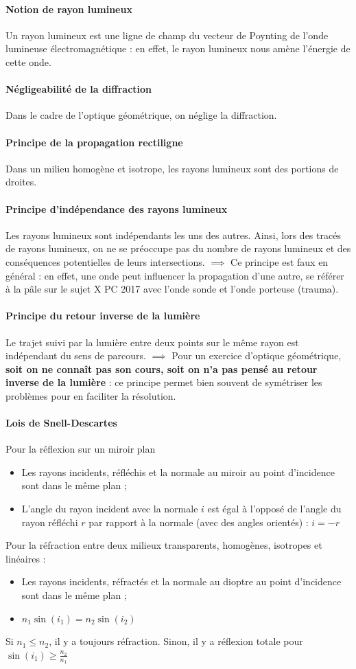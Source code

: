 \documentclass[french]{book}
\theoremstyle{plain}
\theoremstyle{definition}
\theoremstyle{remark}
\begin{document}
\paragraph{Notion de rayon lumineux} Un rayon lumineux est une ligne de champ du vecteur de Poynting de l'onde lumineuse électromagnétique : en effet, le rayon lumineux nous amène l'énergie de cette onde.
\paragraph{Négligeabilité de la diffraction} Dans le cadre de l’optique géométrique, on néglige la diffraction.
\paragraph{Principe de la propagation rectiligne} Dans un milieu homogène et isotrope, les rayons lumineux sont des portions de droites.
\paragraph{Principe d’indépendance des rayons lumineux} Les rayons lumineux sont indépendants les uns des autres. Ainsi, lors des tracés de rayons lumineux, on ne se préoccupe pas du nombre de rayons lumineux et des conséquences potentielles de leurs intersections. $\implies$ Ce principe est faux en général : en effet, une onde peut influencer la propagation d'une autre, se référer à la pâle sur le sujet X PC 2017 avec l'onde sonde et l'onde porteuse (trauma).
\paragraph{Principe du retour inverse de la lumière} Le trajet suivi par la lumière entre deux points sur le même rayon est indépendant du sens de parcours. $\implies$ Pour un exercice d'optique géométrique, \textbf{soit on ne connaît pas son cours, soit on n'a pas pensé au retour inverse de la lumière} : ce principe permet bien souvent de symétriser les problèmes pour en faciliter la résolution.
\paragraph{Lois de Snell-Descartes} Pour la réflexion sur un miroir plan
\begin{itemize}
	\item Les rayons incidents, réfléchis et la normale au miroir au point d’incidence sont dans le même plan ;
	\item L'angle du rayon incident avec la normale $i$ est égal à l'opposé de l'angle du rayon réfléchi $r$ par rapport à la normale (avec des angles orientés) : $i=-r$
\end{itemize}
Pour la réfraction entre deux milieux transparents, homogènes, isotropes et linéaires :
\begin{itemize}
	\item Les rayons incidents, réfractés et la normale au dioptre au point d’incidence sont dans le même plan ;
	\item $n_1\sin(i_1)=n_2\sin(i_2)$
\end{itemize}
Si $n_1\leqslant n_2$, il y a toujours réfraction. Sinon, il y a réflexion totale pour $\displaystyle\sin(i_1)\geqslant\frac{n_2}{n_1}$
\end{document}
